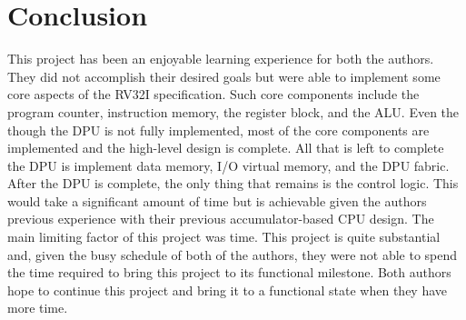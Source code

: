 \documentclass[lettersize,journal]{IEEEtran}
\begin{document}
\section{Conclusion}
This project has been an enjoyable learning experience for both the authors.
They did not accomplish their desired goals but were able to implement some core aspects of the RV32I specification.
Such core components include the program counter, instruction memory, the register block, and the ALU.
Even the though the DPU is not fully implemented, most of the core components are implemented and the high-level design is complete.
All that is left to complete the DPU is implement data memory, I/O virtual memory, and the DPU fabric.
After the DPU is complete, the only thing that remains is the control logic.
This would take a significant amount of time but is achievable given the authors previous experience with their previous accumulator-based CPU design.
The main limiting factor of this project was time.
This project is quite substantial and, given the busy schedule of both of the authors, they were not able to spend the time required to bring this project to its functional milestone.
Both authors hope to continue this project and bring it to a functional state when they have more time.
\end{document}
